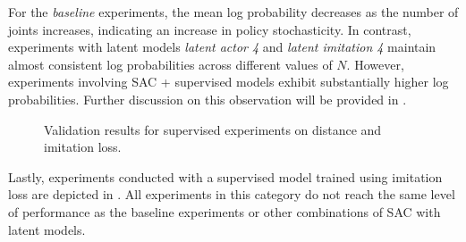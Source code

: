 For the \textit{baseline} experiments, the mean log probability decreases as the number of joints increases, indicating an increase in policy stochasticity. In contrast, experiments with latent models \textit{latent actor 4} and  \textit{latent imitation 4} maintain almost consistent log probabilities across different values of $N$. However, experiments involving SAC + supervised models exhibit substantially higher log probabilities. Further discussion on this observation will be provided in .

\begin{figure}[h]
    \begin{center}
        \hfill
    \end{center}
    \caption[SAC + Supervised Distance and Imitation Loss]{Validation results for supervised experiments on distance and imitation loss. }
    \label{fig:sac_supervised_imitation}
\end{figure}

Lastly, experiments conducted with a supervised model trained using imitation loss are depicted in . All experiments in this category do not reach the same level of performance as the baseline experiments or other combinations of SAC with latent models.